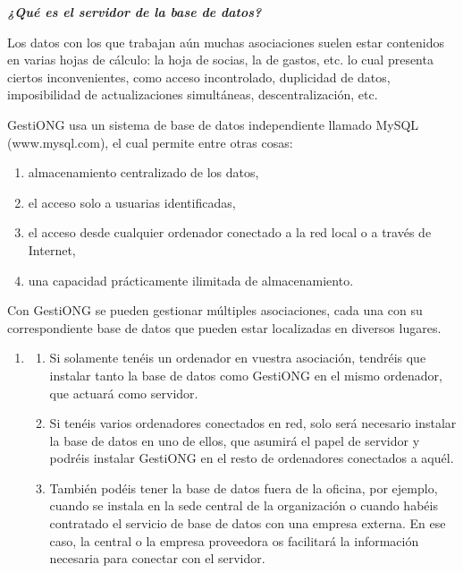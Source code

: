 \begin{center}
\begin{minipage}{7.687cm}
{\centering\bfseries\itshape
¿Qué es el servidor de la base de datos?
\par}

Los datos con los que trabajan aún muchas asociaciones suelen estar
contenidos en varias hojas de cálculo: la hoja de socias, la de
gastos, etc. lo cual presenta ciertos inconvenientes, como acceso
incontrolado, duplicidad de datos, imposibilidad de actualizaciones
simultáneas, descentralización, etc.

GestiONG usa un sistema de base de datos independiente llamado MySQL
(www.mysql.com), el cual permite entre otras cosas:

\liststyleLiv
\begin{enumerate}
\item almacenamiento centralizado de los datos,
\item el acceso solo a usuarias identificadas,
\item el acceso desde cualquier ordenador conectado a la red local o a
través de Internet,
\item una capacidad prácticamente ilimitada de almacenamiento.
\end{enumerate}
Con GestiONG se pueden gestionar múltiples asociaciones, cada una con
su correspondiente base de datos que pueden estar localizadas en
diversos lugares.
\end{minipage}
\end{center}
\liststyleLv
\begin{enumerate}
\item \begin{enumerate}
\item Si solamente tenéis un ordenador en vuestra asociación,
tendréis que instalar tanto la base de datos como GestiONG en el
mismo ordenador, que actuará como servidor.
\item Si tenéis varios ordenadores conectados en red, solo será
necesario instalar la base de datos en uno de ellos, que asumirá el
papel de servidor y podréis instalar GestiONG en el resto de
ordenadores conectados a aquél.
\item También podéis tener la base de datos fuera de la oficina, por
ejemplo, cuando se instala en la sede central de la organización o
cuando habéis contratado el servicio de base de datos con una empresa
externa. En ese caso, la central o la empresa proveedora os
facilitará la información necesaria para conectar con el servidor.
\end{enumerate}
\end{enumerate}

